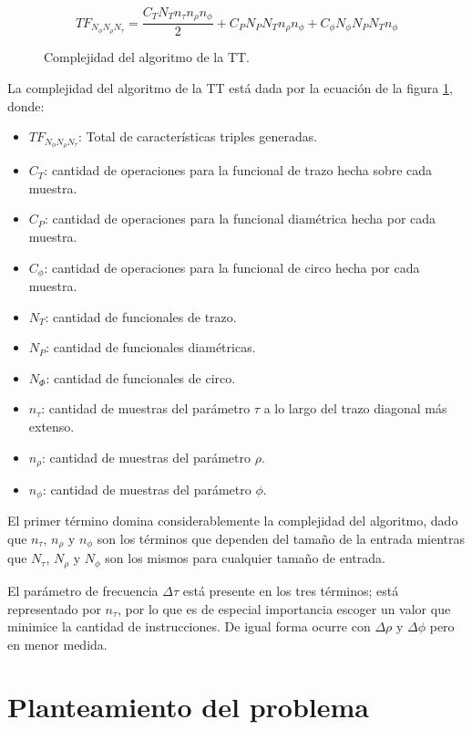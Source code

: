 \begin{figure}[H]
    \begin{equation*}
        TF_{N_{\phi} N_{\rho} N_{\tau}} =
        \frac{C_{T}N_{T}n_{\tau}n_{\rho}n_{\phi}}{2} +
        C_{P}N_{P}N_{T}n_{\rho}n_{\phi} +
        C_{\phi}N_{\phi}N_{P}N_{T}n_{\phi}
    \end{equation*}
    \caption{Complejidad del algoritmo de la TT.}
    \label{eq:complejidad}
\end{figure}

La complejidad del algoritmo de la TT está dada por la ecuación de la figura \ref{eq:complejidad}, donde:
\begin{itemize}
    \item $TF_{N_{\phi} N_{\rho} N_{\tau}}$: Total de características triples generadas.
    \item $C_{T}$: cantidad de operaciones para la funcional de trazo hecha sobre cada muestra.
    \item $C_{P}$: cantidad de operaciones para la funcional diamétrica hecha por cada muestra.
    \item $C_{\phi}$: cantidad de operaciones para la funcional de circo hecha por cada muestra.
    \item $N_T$: cantidad de funcionales de trazo.
    \item $N_P$: cantidad de funcionales diamétricas.
    \item $N_\Phi$: cantidad de funcionales de circo.
    \item $n_\tau$: cantidad de muestras del parámetro $\tau$ a lo largo del trazo diagonal más extenso.
    \item $n_\rho$: cantidad de muestras del parámetro $\rho$.
    \item $n_{\phi}$: cantidad de muestras del parámetro $\phi$.
\end{itemize}

El primer término domina considerablemente la complejidad del algoritmo, dado que $n_\tau$, $n_\rho$ y $n_\phi$ son los términos que dependen del tamaño de la entrada mientras que $N_\tau$, $N_\rho$ y $N_\phi$ son los mismos para cualquier tamaño de entrada.

El parámetro de frecuencia $\Delta \tau$ está presente en los tres términos; está representado por $n_\tau$, por lo que es de especial importancia escoger un valor que minimice la cantidad de instrucciones. De igual forma ocurre con $\Delta \rho$ y $\Delta \phi$ pero en menor medida.


\section{Planteamiento del problema}

